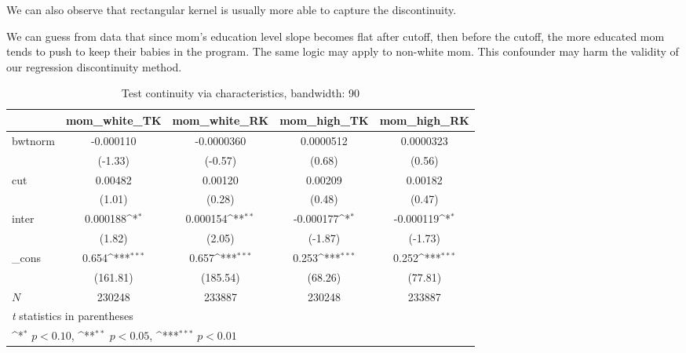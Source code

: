 \documentclass[a4paper,11pt]{article}
\begin{document}
We can also observe that rectangular kernel is usually more able to capture the discontinuity.

We can guess from data that since mom's education level slope becomes flat after cutoff, then before the cutoff, the more educated mom tends to push to keep their babies in the program. The same logic may apply to non-white mom. This confounder may harm the validity of our regression discontinuity method.



\begin{table}[htbp]\centering
\def\sym#1{\ifmmode^{#1}\else\(^{#1}\)\fi}
\caption{Test continuity via characteristics, bandwidth: 90}
\label{A3.bw90}
\begin{tabular}{l*{4}{c}}
\hline\hline
            &\multicolumn{1}{c}{mom\_white\_TK}&\multicolumn{1}{c}{mom\_white\_RK}&\multicolumn{1}{c}{mom\_high\_TK}&\multicolumn{1}{c}{mom\_high\_RK}\\
\hline
bwtnorm     &   -0.000110         &  -0.0000360         &   0.0000512         &   0.0000323         \\
            &     (-1.33)         &     (-0.57)         &      (0.68)         &      (0.56)         \\
[1em]
cut         &     0.00482         &     0.00120         &     0.00209         &     0.00182         \\
            &      (1.01)         &      (0.28)         &      (0.48)         &      (0.47)         \\
[1em]
inter       &    0.000188\sym{*}  &    0.000154\sym{**} &   -0.000177\sym{*}  &   -0.000119\sym{*}  \\
            &      (1.82)         &      (2.05)         &     (-1.87)         &     (-1.73)         \\
[1em]
\_cons      &       0.654\sym{***}&       0.657\sym{***}&       0.253\sym{***}&       0.252\sym{***}\\
            &    (161.81)         &    (185.54)         &     (68.26)         &     (77.81)         \\
\hline
\(N\)       &      230248         &      233887         &      230248         &      233887         \\
\hline\hline
\multicolumn{5}{l}{\footnotesize \textit{t} statistics in parentheses}\\
\multicolumn{5}{l}{\footnotesize \sym{*} \(p<0.10\), \sym{**} \(p<0.05\), \sym{***} \(p<0.01\)}\\
\end{tabular}
\end{table}
\end{document}

